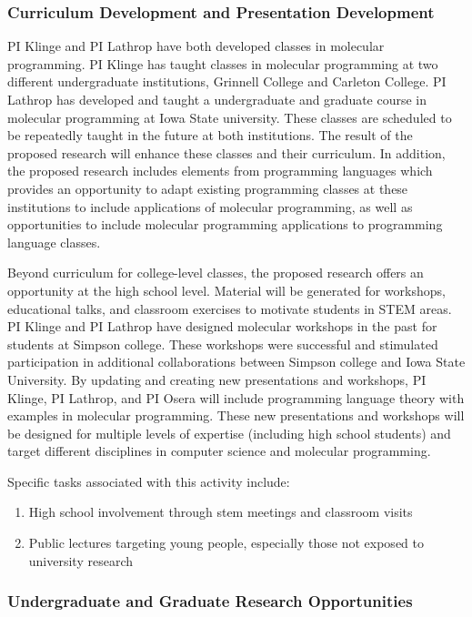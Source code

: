 \subsubsection*{Curriculum Development and Presentation Development}
PI Klinge and PI Lathrop have both developed classes in molecular programming. PI Klinge has taught classes in molecular programming at two different undergraduate institutions, Grinnell College and Carleton College.
PI Lathrop has developed and taught a undergraduate and graduate course in molecular programming at Iowa State university.
These classes are scheduled to be repeatedly taught in the future at both institutions.
The result of the proposed research will enhance these classes and their curriculum.
In addition, the proposed research includes elements from programming languages which provides an opportunity to adapt existing programming classes at these institutions to include applications of molecular programming, as well as opportunities to include molecular programming applications to programming language classes.

Beyond curriculum for college-level classes, the proposed research offers an opportunity at the high school level.
Material will be generated for workshops, educational talks, and classroom exercises to  motivate students in STEM areas.  PI Klinge and PI Lathrop have designed molecular workshops in the past for students at Simpson college.
These workshops were successful and stimulated participation in additional collaborations between Simpson college and Iowa State University.
By updating and creating new presentations and workshops, PI Klinge, PI Lathrop, and PI Osera will include programming language theory with examples in molecular programming.
These new presentations and workshops will be designed for multiple levels of expertise (including high school students) and target different disciplines in computer science and molecular programming.

Specific tasks associated with this activity include:
\begin{enumerate}
	\item High school involvement through stem meetings and classroom visits
	\item Public lectures targeting young people, especially those not exposed to university research
\end{enumerate}

\subsubsection*{Undergraduate and Graduate Research Opportunities}

